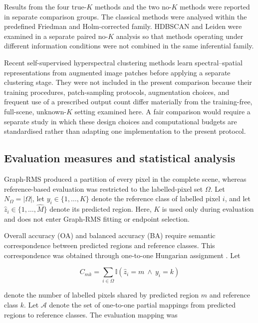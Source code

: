 \documentclass[10pt,a4paper,fleqn]{article}
\begin{document}
Results from the four true-\(K\) methods and the two no-\(K\) methods were
reported in separate comparison groups. The classical methods were analysed
within the predefined Friedman and Holm-corrected family. HDBSCAN and Leiden
were examined in a separate paired no-\(K\) analysis so that methods operating
under different information conditions were not combined in the same
inferential family.

Recent self-supervised hyperspectral clustering methods learn spectral--spatial
representations from augmented image patches before applying a separate
clustering stage. They were not included in the present comparison because
their training procedures, patch-sampling protocols, augmentation choices, and
frequent use of a prescribed output count differ materially from the
training-free, full-scene, unknown-\(K\) setting examined here. A fair
comparison would require a separate study in which these design choices and
computational budgets are standardised rather than adapting one implementation
to the present protocol.
\subsection{Evaluation measures and statistical analysis}
\label{subsec:evaluation}

Graph-RMS produced a partition of every pixel in the complete scene, whereas
reference-based evaluation was restricted to the labelled-pixel set
\(\Omega\). Let \(N_{\Omega}=|\Omega|\), let \(y_i\in\{1,\ldots,K\}\)
denote the reference class of labelled pixel \(i\), and let
\(\widehat{z}_i\in\{1,\ldots,\widehat{M}\}\) denote its predicted region.
Here, \(K\) is used only during evaluation and does not enter Graph-RMS fitting
or endpoint selection.

Overall accuracy (OA) and balanced accuracy (BA) require semantic
correspondence between predicted regions and reference classes. This
correspondence was obtained through one-to-one Hungarian assignment
\citep{munkres1957}. Let

\begin{equation}
C_{mk}
=
\sum_{i\in\Omega}
\mathbb{I}
\left(
\widehat{z}_i=m
\ \land\
y_i=k
\right)
\label{eq:contingency_matrix}
\end{equation}

denote the number of labelled pixels shared by predicted region \(m\) and
reference class \(k\). Let \(\mathcal{A}\) denote the set of one-to-one
partial mappings from predicted regions to reference classes. The evaluation
mapping was
\end{document}
